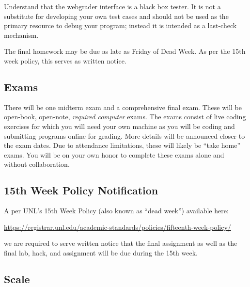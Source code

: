 \documentclass[12pt]{scrartcl}
\begin{document}
Understand that the webgrader interface is a black box tester.  
It is not a substitute for developing your own test cases and 
should not be used as the primary resource to debug your program; 
instead it is intended as a last-check mechanism.

The final homework may be due as late as Friday of Dead Week.  
As per the 15th week policy, this serves as written notice.

\subsection{Exams}

There will be one midterm exam and a comprehensive final exam.  These
will be open-book, open-note, \emph{required computer} exams.  The
exams consist of live coding exercises for which you will need your
own machine as you will be coding and submitting programs online for
grading.  More details will be announced closer to the exam dates.
Due to attendance limitations, these will likely be ``take home''
exams.  You will be on your own honor to complete these exams alone
and without collaboration.


\subsection{15th Week Policy Notification}
\label{subsection:deadweek}

A per UNL's 15th Week Policy (also known as ``dead week'') available here: 

\url{https://registrar.unl.edu/academic-standards/policies/fifteenth-week-policy/}

we are required to serve written notice that the final assignment
as well as the final lab, hack, and assignment will be due during the 15th 
week.

\subsection{Scale}
\end{document}
